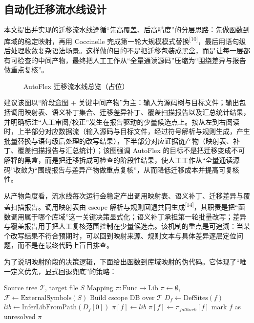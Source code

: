 \documentclass[UTF8,a4paper,12pt]{ctexart}
\numberwithin{equation}{section}
\begin{document}
\subsection{自动化迁移流水线设计}

本文提出并实现的迁移流水线遵循``先高覆盖、后高精度''的分层思路：先做函数到库域的稳定映射，再用
Coccinelle
完成第一轮大规模模式替换\textsuperscript{[10]}，最后用语句级后处理收敛复杂语法场景。这样做的目的不是把迁移包装成黑盒，而是让每一层都有可检查的中间产物，最终把人工工作从``全量通读源码''压缩为``围绕差异与报告做重点复核''。

\begin{figure}[htbp]
  \centering
  \caption{AutoFlex 迁移流水线总览（占位）}
  \label{fig:autoflex-pipeline-placeholder}
\end{figure}

建议该图以``阶段盒图 +
关键中间产物''为主：输入为源码树与目标文件；输出包括调用映射表、语义补丁集合、迁移差异补丁、覆盖扫描报告以及汇总统计结果，并明确标注``人工审阅/校正''发生在报告驱动的少量候选点上。按从左到右阅读时，上半部分对应数据流（输入源码与目标文件，经过符号解析与规则生成，产生批量替换与语句级后处理的改写结果），下半部分对应证据链产物（映射表、补丁、覆盖扫描报告与汇总统计）；该图强调 AutoFlex 的目标不是把迁移变成不可解释的黑盒，而是把迁移拆成可检查的阶段性结果，使人工工作从``全量通读源码''收敛为``围绕报告与差异产物做重点复核''，从而降低迁移成本并提高可复核性。

从产物角度看，流水线每次运行会稳定产出调用映射表、语义补丁、迁移差异与覆盖扫描报告。调用映射表由
cscope
解析与规则回退共同生成\textsuperscript{[14]}，其职责是把``函数调用属于哪个库域''这一关键决策显式化；语义补丁承担第一轮批量改写；差异与覆盖报告用于把人工复核范围控制在少量候选点。该机制的重点是可追溯：当某个改写结果不符合预期时，可以回到映射来源、规则文本与具体差异逐层定位问题，而不是在最终代码上盲目排查。

为了说明映射阶段的决策逻辑，下面给出函数到库域映射的伪代码。它体现了``唯一定义优先，显式回退兜底''的策略：
\begin{algorithm}[htbp]
\caption{Function-to-Library Mapping ($\pi$)}
\label{alg:func-lib-mapping}
\begin{algorithmic}[1]
\Require Source tree $\mathcal{T}$, target file $S$
\Ensure Mapping $\pi: \text{Func} \rightarrow \text{Lib}$
\State $\pi \gets \emptyset$, $\mathcal{F} \gets \text{ExternalSymbols}(S)$
\State Build cscope DB over $\mathcal{T}$
  \State $D_f \gets \text{DefSites}(f)$
    \State $lib \gets \text{InferLibFromPath}(D_f[0])$
    \State $\pi[f] \gets lib$
  \Else
      \State $\pi[f] \gets \pi_{fallback}[f]$
    \Else
      \State mark $f$ as unresolved
    \EndIf
  \EndIf
\EndFor
\State \Return $\pi$
\end{algorithmic}
\end{algorithm}
\end{document}
